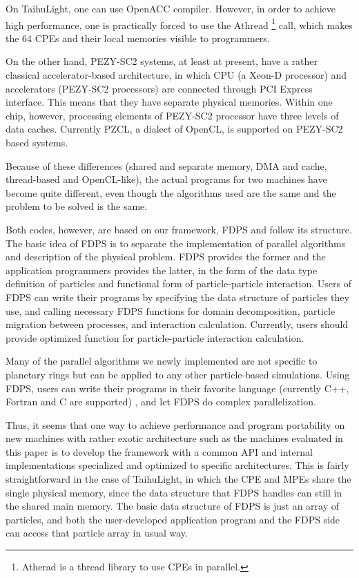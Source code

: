 \documentclass[Afour,sageh,times]{sagej}
\newcommand{\rev}[1]{{#1}}
\begin{document}
On TaihuLight, one can use OpenACC compiler. However, in order to
achieve high performance, one is practically forced to use the Athread
\footnote{\rev{Atherad is a thread library to use CPEs in parallel.}}
call, which makes the 64 CPEs and their local memories visible to
programmers.



On the other hand, PEZY-SC2 systems, at least at present, have a
rather classical accelerator-based architecture, in which CPU (a
Xeon-D processor) and accelerators (PEZY-SC2 processors) are connected
through PCI Express interface. This means that they have separate
physical memories. Within one chip, however, processing elements of
PEZY-SC2 processor have three levels of data caches. Currently PZCL, a
dialect of OpenCL, is supported on PEZY-SC2 based systems.

Because of these differences (shared and separate memory, DMA and
cache, thread-based and OpenCL-like), the actual programs for two
machines have become quite different, even though the algorithms used
are the same and the problem to be solved is the same.

Both codes, however, are based on our framework, FDPS
\citep{Iwasawaetal2016, 2018PASJ...70...70N} and follow its
structure. The basic idea of FDPS is to separate the implementation of
parallel algorithms and description of the physical problem. FDPS
provides the former and the application programmers provides the
latter, in the form of the data type definition of particles and
functional form of particle-particle interaction. Users of FDPS can
write their programs by specifying the data structure of particles
they use, and calling necessary FDPS functions for domain
decomposition, particle migration between processes, and interaction
calculation. Currently, users should provide optimized function for
particle-particle interaction calculation.

Many of the parallel algorithms we newly implemented are not specific
to planetary rings but can be applied to any other particle-based
simulations. Using FDPS, users can write their programs in their
favorite language (currently C++, Fortran and C are supported)
\citep{2018PASJ...70...70N}, and let FDPS do complex parallelization.

Thus, it seems that one way to achieve performance and program
portability on new machines with rather exotic architecture such as
the machines evaluated in this paper is to develop the framework with
a common API and internal implementations specialized and optimized to
specific architectures. This is fairly straightforward in the case of
TaihuLight, in which the CPE and MPEs share the single physical
memory, since the data structure that FDPS handles can still in the
shared main memory. The basic data structure of FDPS is just an array
of particles, and both the user-developed application program and the
FDPS side can access that particle array in usual way.
\end{document}
